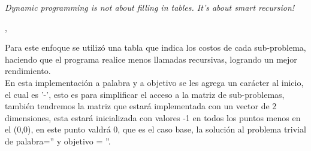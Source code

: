 \epigraph{\textit{Dynamic programming is not about filling in tables. It's about smart recursion!}}{\citeauthor{algorithms_erickson}, \citeyear{algorithms_erickson} \cite{algorithms_erickson}}
Para este enfoque se utilizó una tabla que indica los costos de cada sub-problema, haciendo que el programa realice menos llamadas recursivas, logrando un mejor rendimiento.\\
En esta implementación a palabra y a objetivo se les agrega un carácter al inicio, el cual es '-', esto es para simplificar el acceso a la matriz de sub-problemas, también tendremos la matriz que estará implementada con un vector de 2 dimensiones, esta estará inicializada con valores -1 en todos los puntos menos en el (0,0), en este punto valdrá 0, que es el caso base, la solución al problema trivial de palabra='' y objetivo = ''.\\

